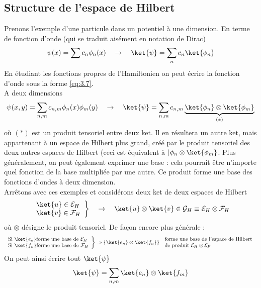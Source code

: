  \subsection{Structure de l'espace de Hilbert}
 Prenons l'exemple d'une particule dans un potentiel à une dimension. En terme de fonction d'onde
 (qui se traduit aisément en notation de Dirac)
 \begin{equation}
 \psi(x) = \sum c_n\phi_n(x)\quad \rightarrow\quad \ket{\psi} = \sum_n c_n
 \ket{\phi_n}
 \label{eq:3.7}
 \end{equation}
 En étudiant les fonctions propres de l'Hamiltonien on peut écrire la fonction 
 d'onde sous la forme \autoref{eq:3.7}.\\
 A deux dimensions
 \begin{equation}
 \psi(x,y) = \sum_{n,m} c_{n,m}\phi_n(x)\phi_m(y)\quad\rightarrow\quad
 \ket{\psi} = \sum_{n,m} c_{n,m} \underbrace{\ket{\phi_n}\otimes\ket{\phi_m}}_{(*)}
 \end{equation}
 où $(*)$ est un produit tensoriel entre deux ket. Il en résultera un autre ket, 
 mais appartenant à un espace de Hilbert plus grand, créé par le produit tensoriel
 des deux autres espaces de Hilbert (ceci est équivalent à 
 $|\phi_n\otimes\ket{\phi_m}$. Plus généralement, on peut également exprimer une base :
  cela pourrait être n'importe quel fonction de la base multipliée par une autre. Ce
 produit forme une base des fonctions d'ondes à deux dimension. \\
 
 Arrêtons avec ces exemples et considérons deux ket de deux espaces de Hilbert
 \begin{equation}
 \left.\begin{array}{ll}
 \ket{u} \in \mathcal{E}_H\\
 \ket{v} \in \mathcal{F}_H 
 \end{array}\right\}\quad\rightarrow\quad \ket{u}\otimes\ket{v} \in\mathcal{G}_H 
 \equiv \mathcal{E}_H\otimes\mathcal{F}_H
 \end{equation}
 où $\otimes$ désigne le produit tensoriel. De façon encore plus générale :
 \begin{equation}
 \left.\begin{array}{l}
 \text{Si } \ket{e_n} \text{forme une base de } \mathcal{E}_H\\
 \text{Si } \ket{f_n} \text{forme une base de } \mathcal{F}_H
 \end{array}\right\}\Rightarrow \left\{\ket{e_n}\otimes\ket{f_n}\right\} \begin{array}{l}
 \text{ forme  une base de l'espace de Hilbert }\\
 \text{  de produit $\mathcal{E}_H\otimes\mathcal{E}_F$}
 \end{array}
 \end{equation}
 On peut ainsi écrire tout $\ket{\psi}$
 \begin{equation}
 \ket{\psi} = \sum_{n,m} \ket{e_n}\otimes\ket{f_m}
 \end{equation}
 
